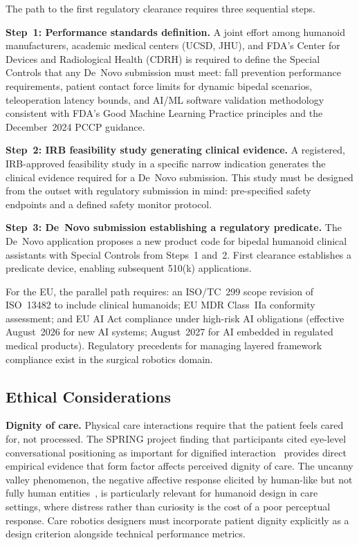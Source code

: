 \documentclass[acmsmall]{acmart}
\begin{document}
The path to the first regulatory clearance requires three sequential steps.

\textbf{Step~1: Performance standards definition.} A joint effort among humanoid
manufacturers, academic medical centers (UCSD, JHU), and FDA's Center for Devices
and Radiological Health (CDRH) is required to define the Special Controls that
any De~Novo submission must meet: fall prevention performance requirements, patient
contact force limits for dynamic bipedal scenarios, teleoperation latency bounds,
and AI/ML software validation methodology consistent with FDA's Good Machine
Learning Practice principles and the December~2024 PCCP guidance.

\textbf{Step~2: IRB feasibility study generating clinical evidence.} A registered,
IRB-approved feasibility study in a specific narrow indication generates the
clinical evidence required for a De~Novo submission. This study must be designed
from the outset with regulatory submission in mind: pre-specified safety endpoints
and a defined safety monitor protocol.

\textbf{Step~3: De~Novo submission establishing a regulatory predicate.} The
De~Novo application proposes a new product code for bipedal humanoid clinical
assistants with Special Controls from Steps~1 and~2. First clearance establishes
a predicate device, enabling subsequent 510(k) applications.

For the EU, the parallel path requires: an ISO/TC~299 scope revision of
ISO~13482 to include clinical humanoids; EU MDR Class~IIa conformity assessment;
and EU AI Act compliance under high-risk AI obligations (effective August~2026 for
new AI systems; August~2027 for AI embedded in regulated medical products).
Regulatory precedents for managing layered framework compliance exist in the
surgical robotics domain.

\subsection{Ethical Considerations}
\label{sec:ethics}

\textbf{Dignity of care.} Physical care interactions require that the patient
feels cared for, not processed. The SPRING project finding that participants cited
eye-level conversational positioning as important for dignified
interaction~\cite{alamedapineda2024spring} provides direct empirical evidence that
form factor affects perceived dignity of care. The uncanny valley phenomenon, the
negative affective response elicited by human-like but not fully human
entities~\cite{mori2012uncanny}, is particularly relevant for humanoid design in
care settings, where distress rather than curiosity is the cost of a poor
perceptual response. Care robotics designers must incorporate patient dignity
explicitly as a design criterion alongside technical performance metrics.
\end{document}
